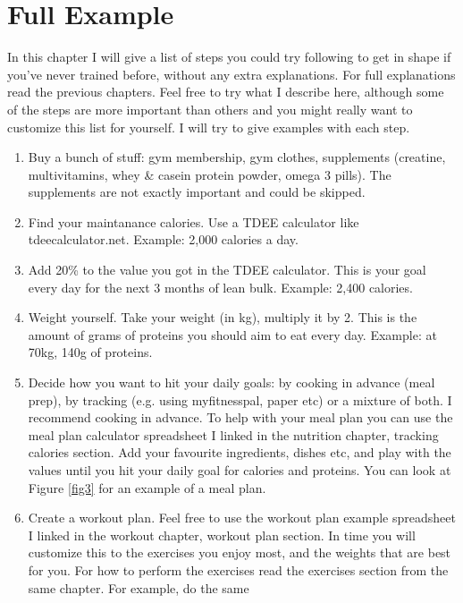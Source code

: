 \documentclass[openany, 12pt]{book}
\begin{document}
  \chapter{Full Example}

  
  In this chapter I will give a list of steps you could try following to get in shape if you've never trained before, without any extra explanations.
  For full explanations read the previous chapters. Feel free to try what I describe here,
  although some of the steps are more important than others and you might really want to customize this list for yourself. I will try to give examples with each step.
        
        \begin{enumerate}
                \item Buy a bunch of stuff: gym membership, gym clothes, supplements (creatine, multivitamins, whey \& casein protein powder, omega 3 pills). The supplements are not exactly important
                  and could be skipped.
                \item Find your maintanance calories. Use a TDEE calculator like tdeecalculator.net. Example: 2,000 calories a day.
                \item Add 20\% to the value you got in the TDEE calculator. This is your goal every day for the next 3 months of lean bulk. Example: 2,400 calories.
                \item Weight yourself. Take your weight (in kg), multiply it by 2. This is the amount of grams of proteins you should aim to eat every day. Example: at 70kg, 140g of proteins.
                \item Decide how you want to hit your daily goals: by cooking in advance (meal prep), by tracking (e.g. using myfitnesspal, paper etc) or a mixture of both. I recommend cooking in
                  advance. To help with your meal plan you can use the meal plan calculator spreadsheet I linked in the nutrition chapter, tracking calories section. Add your favourite ingredients,
                  dishes etc, and play with the values until you hit your daily goal for calories and proteins. You can look at Figure \ref{fig3} for an example of a meal plan.
                \item Create a workout plan. Feel free to use the workout plan example spreadsheet I linked in the workout chapter, workout plan section. In time you will customize this to
                  the exercises you enjoy most, and the weights that are best for you. For how to perform the exercises read the exercises section from the same chapter. For example, do the same

\end{enumerate}
\end{document}
